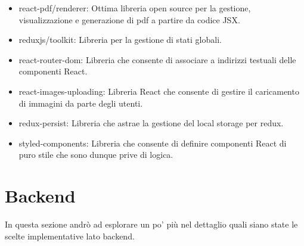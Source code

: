\begin{itemize}
    \item react-pdf/renderer: Ottima libreria open source per la gestione, visualizzazione e generazione di pdf a partire da codice JSX.
    \item reduxjs/toolkit: Libreria per la gestione di stati globali.
    \item react-router-dom: Libreria che consente di associare a indirizzi testuali delle componenti React.
    \item react-images-uploading: Libreria React che consente di gestire il caricamento di immagini da parte degli utenti.
    \item redux-persist: Libreria che astrae la gestione del local storage per redux.
    \item styled-components: Libreria che consente di definire componenti React di puro stile che sono dunque prive di logica.
\end{itemize}



\section{Backend}
In questa sezione andrò ad esplorare un po' più nel dettaglio quali siano state le scelte implementative lato backend.
